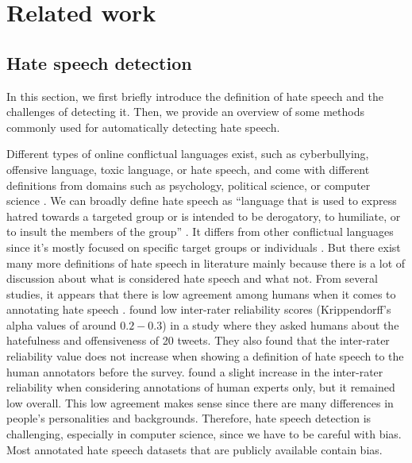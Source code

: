 \chapter{Related work}

\section{Hate speech detection}
In this section, we first briefly introduce the definition of hate speech and the challenges of detecting it. Then, we provide an overview of some methods commonly used for automatically detecting hate speech.

Different types of online conflictual languages exist, such as cyberbullying, offensive language, toxic language, or hate speech, and come with different definitions from domains such as psychology, political science, or computer science \citep{balayn2021automatic}.
%
We can broadly define hate speech as ``language that is used to express hatred towards a targeted group or is intended to be derogatory, to humiliate, or to insult the members of the group'' \citep{davidson2017automated, balayn2021automatic}.
%
It differs from other conflictual languages since it's mostly focused on specific target groups or individuals \citep{balayn2021automatic}.
%
But there exist many more definitions of hate speech in literature mainly because there is a lot of discussion about what is considered hate speech and what not.
%
From several studies, it appears that there is low agreement among humans when it comes to annotating hate speech \citep{fortuna2018survey, ross2017measuring, waseem2016you}.
%
\citet{ross2017measuring} found low inter-rater reliability scores (Krippendorff's alpha values of around $0.2-0.3$) in a study where they asked humans about the hatefulness and offensiveness of 20 tweets.
%
They also found that the inter-rater reliability value does not increase when showing a definition of hate speech to the human annotators before the survey.
%
\citet{waseem2016you} found a slight increase in the inter-rater reliability when considering annotations of human experts only, but it remained low overall.
%
This low agreement makes sense since there are many differences in people's personalities and backgrounds.
%
Therefore, hate speech detection is challenging, especially in computer science, since we have to be careful with bias.
%
Most annotated hate speech datasets that are publicly available contain bias.

